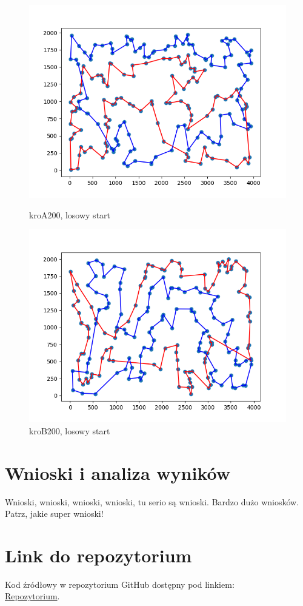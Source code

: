 \documentclass[11pt]{article}
\begin{document}
\begin{figure}[H]
    \begin{minipage}[t]{0.45\textwidth}
        \centering
        \includegraphics[width=\linewidth]{best_paths/kroA200/HAE}
        \caption{kroA200, losowy start}
    \end{minipage}
    \hfill
    \begin{minipage}[t]{0.45\textwidth}
        \centering
        \includegraphics[width=\linewidth]{best_paths/kroB200/HAE}
        \caption{kroB200, losowy start}
    \end{minipage}\label{fig:figure8}
\end{figure}


\section{Wnioski i analiza wyników}\label{sec:wnioski}

Wnioski, wnioski, wnioski, wnioski, tu serio są wnioski.
Bardzo dużo wniosków.
Patrz, jakie super wnioski!


\section{Link do repozytorium}\label{sec:link-do-repo}
Kod źródłowy w repozytorium GitHub dostępny pod linkiem: \\
\href{https://github.com/KotZPolibudy/PUT_IMO/tree/main/Lab5%20-%20Ewolucyjny}{Repozytorium}.
\end{document}
